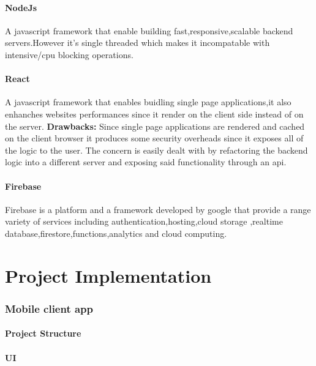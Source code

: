 \documentclass{article}
\begin{document}
\subsection{NodeJs}
A javascript framework that enable building fast,responsive,scalable backend servers.However it's single threaded which makes it incompatable with intensive/cpu blocking operations.
\subsection{React}
A javascript framework that enables buidling single page applications,it also enhanches websites performances since it render on the client side instead of on the server.\linebreak
\textbf{Drawbacks:}
Since single page applications are rendered and cached on the client browser it produces some security overheads since it exposes all of the logic to the user.
The concern is easily dealt with by refactoring the backend logic into a different server and exposing said functionality through an api.
\subsection{Firebase}
Firebase is a platform and a framework developed by google that provide a range variety of services including authentication,hosting,cloud storage ,realtime database,firestore,functions,analytics and cloud computing.


\part{Project Implementation}
\section{Mobile client app}
\subsection{Project Structure}
\subsection{UI}
\end{document}
